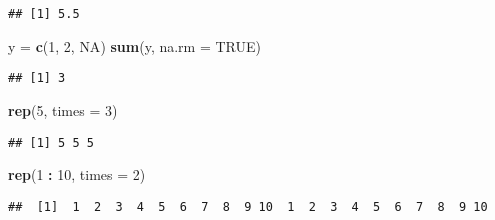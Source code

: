 \documentclass[
]{article}
\newenvironment{Shaded}{\begin{snugshade}}{\end{snugshade}}
\newcommand{\AttributeTok}[1]{\textcolor[rgb]{0.13,0.29,0.53}{#1}}
\newcommand{\ConstantTok}[1]{\textcolor[rgb]{0.56,0.35,0.01}{#1}}
\newcommand{\DecValTok}[1]{\textcolor[rgb]{0.00,0.00,0.81}{#1}}
\newcommand{\FunctionTok}[1]{\textcolor[rgb]{0.13,0.29,0.53}{\textbf{#1}}}
\newcommand{\NormalTok}[1]{#1}
\newcommand{\OtherTok}[1]{\textcolor[rgb]{0.56,0.35,0.01}{#1}}
\newcommand{\SpecialCharTok}[1]{\textcolor[rgb]{0.81,0.36,0.00}{\textbf{#1}}}
\begin{document}
\begin{verbatim}
## [1] 5.5
\end{verbatim}

\begin{Shaded}
\begin{Highlighting}[]
\NormalTok{y }\OtherTok{=} \FunctionTok{c}\NormalTok{(}\DecValTok{1}\NormalTok{, }\DecValTok{2}\NormalTok{, }\ConstantTok{NA}\NormalTok{)}
\FunctionTok{sum}\NormalTok{(y, }\AttributeTok{na.rm =} \ConstantTok{TRUE}\NormalTok{)}
\end{Highlighting}
\end{Shaded}

\begin{verbatim}
## [1] 3
\end{verbatim}

\begin{Shaded}
\begin{Highlighting}[]
\FunctionTok{rep}\NormalTok{(}\DecValTok{5}\NormalTok{, }\AttributeTok{times =} \DecValTok{3}\NormalTok{)}
\end{Highlighting}
\end{Shaded}

\begin{verbatim}
## [1] 5 5 5
\end{verbatim}

\begin{Shaded}
\begin{Highlighting}[]
\FunctionTok{rep}\NormalTok{(}\DecValTok{1} \SpecialCharTok{:} \DecValTok{10}\NormalTok{, }\AttributeTok{times =} \DecValTok{2}\NormalTok{)}
\end{Highlighting}
\end{Shaded}

\begin{verbatim}
##  [1]  1  2  3  4  5  6  7  8  9 10  1  2  3  4  5  6  7  8  9 10
\end{verbatim}
\end{document}
